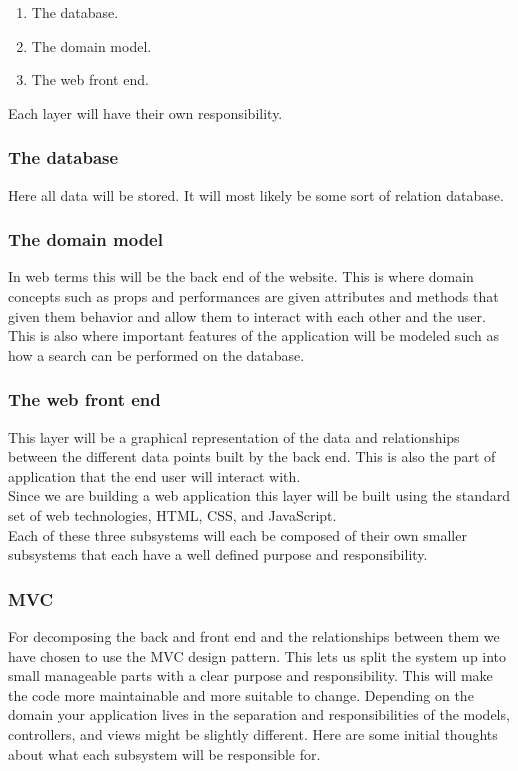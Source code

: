 \documentclass[12pt]{article}
\begin{document}
\begin{enumerate}
  \item The database.
  \item The domain model.
  \item The web front end.
\end{enumerate}
Each layer will have their own responsibility.
\subsubsection{The database}
Here all data will be stored. It will most likely be some sort of relation database.
\subsubsection{The domain model}
In web terms this will be the back end of the website. This is where domain
concepts such as props and performances are given attributes and methods that
given them behavior and allow them to interact with each other and the user.
This is also where important features of the application will be modeled such as
how a search can be performed on the database.
\subsubsection{The web front end}
This layer will be a graphical representation of the data and relationships
between the different data points built by the back end. This is also the part
of application that the end user will interact with. \\
Since we are building a web application this layer will be built using the
standard set of web technologies, HTML, CSS, and JavaScript.\\
Each of these three subsystems will each be composed of their own smaller
subsystems that each have a well defined purpose and responsibility.
\subsubsection{MVC}
For decomposing the back and front end and the relationships between them we
have chosen to use the MVC design pattern. This lets us split the system up into
small manageable parts with a clear purpose and responsibility. This will make
the code more maintainable and more suitable to change.
Depending on the domain your application lives in the separation and
responsibilities of the models, controllers, and views might be slightly
different. Here are some initial thoughts about what each subsystem will be
responsible for.
\end{document}
